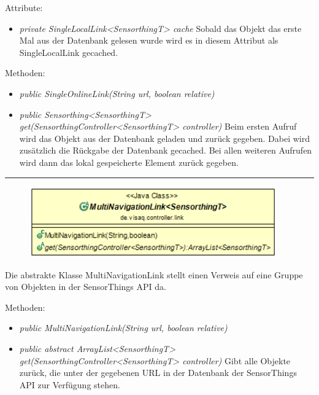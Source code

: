 Attribute:
\begin{itemize}
    \item \emph{private SingleLocalLink<SensorthingT> cache} Sobald das Objekt das erste Mal aus der Datenbank gelesen wurde wird es in diesem Attribut als SingleLocalLink gecached.
\end{itemize}
Methoden:
\begin{itemize}
    \item \emph{public SingleOnlineLink(String url, boolean relative)}
    \relativeDescription
    \item \emph{public Sensorthing<SensorthingT> get(SensorthingController<SensorthingT> controller)}
    Beim ersten Aufruf wird das Objekt aus der Datenbank geladen und zurück gegeben.
    Dabei wird zusätzlich die Rückgabe der Datenbank gecached.
    Bei allen weiteren Aufrufen wird dann das lokal gespeicherte Element zurück gegeben.
\end{itemize}

\rule{\textwidth}{0.4pt}
\begin{minipage}{0.4\textwidth}
    \begin{figure}[H]
        {\centering\includegraphics[width=0.95\textwidth]{media/backend/controller/classes/MultiNavigationLink.png}}
    \end{figure}
    \end{minipage} \hfill
\begin{minipage}{0.6\textwidth}
    Die abstrakte Klasse MultiNavigationLink stellt einen Verweis auf eine Gruppe von Objekten in der \gls{SensorThings API} da.
\end{minipage}

Methoden:
\begin{itemize}
    \item \emph{public MultiNavigationLink(String url, boolean relative)}
    \relativeDescription
    \item \emph{public abstract ArrayList<SensorthingT> get(SensorthingController<SensorthingT> controller)}
    Gibt alle Objekte zurück, die unter der gegebenen URL in der Datenbank der \gls{SensorThings API} zur Verfügung stehen.
\end{itemize}

